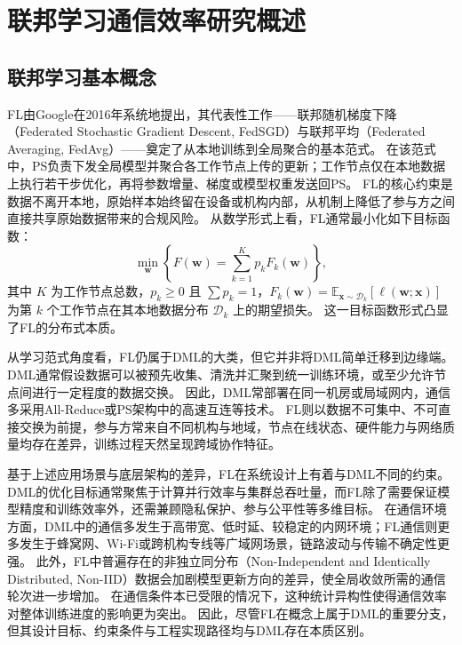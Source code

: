 \documentclass[master, vlined]{DissertUESTC}
\begin{document}
	\section{联邦学习通信效率研究概述}

	\subsection{联邦学习基本概念}

	FL由Google在2016年系统地提出，其代表性工作——联邦随机梯度下降（Federated Stochastic Gradient Descent, FedSGD）与联邦平均（Federated Averaging, FedAvg）——奠定了从本地训练到全局聚合的基本范式。
	在该范式中，PS负责下发全局模型并聚合各工作节点上传的更新；工作节点仅在本地数据上执行若干步优化，再将参数增量、梯度或模型权重发送回PS。
	FL的核心约束是数据不离开本地，原始样本始终留在设备或机构内部，从机制上降低了参与方之间直接共享原始数据带来的合规风险。
	从数学形式上看，FL通常最小化如下目标函数：
	\begin{equation}
		\min_{\mathbf{w}} \left\{ F(\mathbf{w}) = \sum_{k=1}^{K} p_k F_k(\mathbf{w}) \right\},
	\end{equation}
	其中 $K$ 为工作节点总数，$p_k \ge 0$ 且 $\sum p_k = 1$，$F_k(\mathbf{w}) = \mathbb{E}_{\mathbf{x} \sim \mathcal{D}_k}[ \ell(\mathbf{w}; \mathbf{x}) ]$ 为第 $k$ 个工作节点在其本地数据分布 $\mathcal{D}_k$ 上的期望损失。
	这一目标函数形式凸显了FL的分布式本质。

	从学习范式角度看，FL仍属于DML的大类，但它并非将DML简单迁移到边缘端。
	DML通常假设数据可以被预先收集、清洗并汇聚到统一训练环境，或至少允许节点间进行一定程度的数据交换。
	因此，DML常部署在同一机房或局域网内，通信多采用All-Reduce或PS架构中的高速互连等技术。
	FL则以数据不可集中、不可直接交换为前提，参与方常来自不同机构与地域，节点在线状态、硬件能力与网络质量均存在差异，训练过程天然呈现跨域协作特征。

	基于上述应用场景与底层架构的差异，FL在系统设计上有着与DML不同的约束。
	DML的优化目标通常聚焦于计算并行效率与集群总吞吐量，而FL除了需要保证模型精度和训练效率外，还需兼顾隐私保护、参与公平性等多维目标。
	在通信环境方面，DML中的通信多发生于高带宽、低时延、较稳定的内网环境；FL通信则更多发生于蜂窝网、Wi-Fi或跨机构专线等广域网场景，链路波动与传输不确定性更强。
	此外，FL中普遍存在的非独立同分布（Non-Independent and Identically Distributed, Non-IID）数据会加剧模型更新方向的差异，使全局收敛所需的通信轮次进一步增加。
	在通信条件本已受限的情况下，这种统计异构性使得通信效率对整体训练进度的影响更为突出。
	因此，尽管FL在概念上属于DML的重要分支，但其设计目标、约束条件与工程实现路径均与DML存在本质区别。
\end{document}
